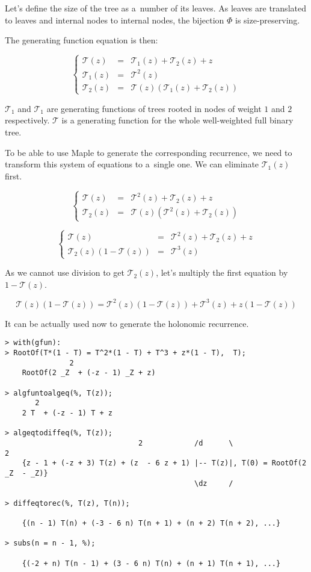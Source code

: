 \documentclass[final]{article}
\theoremstyle{definition}
\theoremstyle{definition}
\theoremstyle{remark}
\newcommand{\gf}[1]{\ensuremath{\mathcal{#1}}}
\begin{document}
Let's define the size of the tree as a~number of its leaves. As leaves are translated to leaves and internal nodes to internal nodes, the bijection \(\Phi\) is size-preserving.

The generating function equation is then:

\[\left\{\begin{array}{rcl}
            \gf{T}(z) &=& \gf{T}_1(z) + \gf{T}_2(z) + z\\
            \gf{T}_1(z) &=& \gf{T}^2(z)\\
            \gf{T}_2(z) &=& \gf{T}(z)(\gf{T}_1(z) + \gf{T}_2(z))
\end{array}\right.\]

\(\gf{T}_1\) and \(\gf{T}_1\) are generating functions of trees rooted in nodes of weight \(1\) and \(2\) respectively. \(\gf{T}\) is a generating function for the whole well-weighted full binary tree.

To be able to use Maple to generate the corresponding recurrence, we need to transform this system of equations to a~single one. We can eliminate \(\gf{T}_1(z)\) first.

\[\left\{\begin{array}{rcl}
            \gf{T}(z) &=& \gf{T}^2(z) + \gf{T}_2(z) + z\\
            \gf{T}_2(z) &=& \gf{T}(z)(\gf{T}^2(z) + \gf{T}_2(z))
\end{array}\right.\]

\[\left\{\begin{array}{rcl}
            \gf{T}(z) &=& \gf{T}^2(z) + \gf{T}_2(z) + z\\
            \gf{T}_2(z)(1 - \gf{T}(z)) &=& \gf{T}^3(z)
\end{array}\right.\]

As we cannot use division to get \(\gf{T}_2(z)\), let's multiply the first equation by \(1 - \gf{T}(z)\).

\[\gf{T}(z)(1 - \gf{T}(z)) = \gf{T}^2(z)(1 - \gf{T}(z)) + \gf{T}^3(z) + z(1 - \gf{T}(z))\]

It can be actually used now to generate the holonomic recurrence.

\begin{lstlisting}
> with(gfun):
> RootOf(T*(1 - T) = T^2*(1 - T) + T^3 + z*(1 - T),  T);
               2
    RootOf(2 _Z  + (-z - 1) _Z + z)

> algfuntoalgeq(%, T(z));
       2
    2 T  + (-z - 1) T + z

> algeqtodiffeq(%, T(z));
                               2            /d      \                   2
    {z - 1 + (-z + 3) T(z) + (z  - 6 z + 1) |-- T(z)|, T(0) = RootOf(2 _Z  - _Z)}
                                            \dz     /

> diffeqtorec(%, T(z), T(n));

    {(n - 1) T(n) + (-3 - 6 n) T(n + 1) + (n + 2) T(n + 2), ...}

> subs(n = n - 1, %);

    {(-2 + n) T(n - 1) + (3 - 6 n) T(n) + (n + 1) T(n + 1), ...}
\end{lstlisting}
\end{document}
